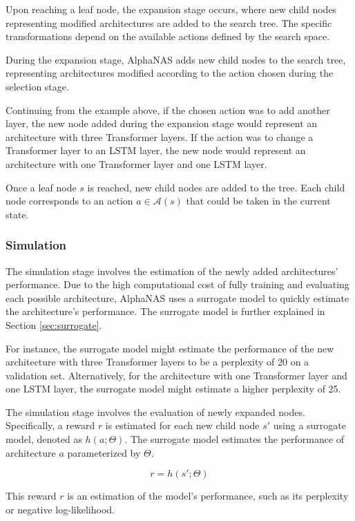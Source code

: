 \documentclass{article}
\begin{document}
Upon reaching a leaf node, the expansion stage occurs, where new child nodes representing modified architectures are added to the search tree. The specific transformations depend on the available actions defined by the search space.

During the expansion stage, AlphaNAS adds new child nodes to the search tree, representing architectures modified according to the action chosen during the selection stage.

Continuing from the example above, if the chosen action was to add another layer, the new node added during the expansion stage would represent an architecture with three Transformer layers. If the action was to change a Transformer layer to an LSTM layer, the new node would represent an architecture with one Transformer layer and one LSTM layer.

Once a leaf node $s$ is reached, new child nodes are added to the tree. Each child node corresponds to an action $a \in \mathcal{A}(s)$ that could be taken in the current state. 

\subsubsection{Simulation}

The simulation stage involves the estimation of the newly added architectures' performance. Due to the high computational cost of fully training and evaluating each possible architecture, AlphaNAS uses a surrogate model to quickly estimate the architecture's performance. The surrogate model is further explained in Section \ref{sec:surrogate}.

For instance, the surrogate model might estimate the performance of the new architecture with three Transformer layers to be a perplexity of 20 on a validation set. Alternatively, for the architecture with one Transformer layer and one LSTM layer, the surrogate model might estimate a higher perplexity of 25.

The simulation stage involves the evaluation of newly expanded nodes. Specifically, a reward $r$ is estimated for each new child node $s'$ using a surrogate model, denoted as $h(a;\Theta)$. The surrogate model estimates the performance of architecture $a$ parameterized by $\Theta$.

\begin{equation}
r = h(s';\Theta)
\end{equation}

This reward $r$ is an estimation of the model's performance, such as its perplexity or negative log-likelihood.
\end{document}
